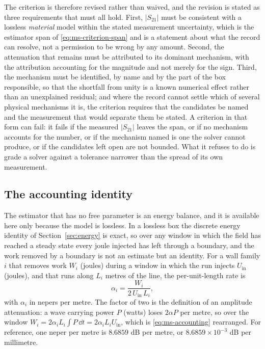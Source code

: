 The criterion is therefore revised rather than waived, and the revision is stated as three requirements that
must all hold. First, $|S_{21}|$ must be consistent with a lossless \emph{material} model within the stated
measurement uncertainty, which is the estimator span of \eqref{eq:ms-criterion-span} and is a statement about
what the record can resolve, not a permission to be wrong by any amount. Second, the attenuation that remains
must be attributed to its dominant mechanism, with the attribution accounting for the magnitude and not merely
for the sign. Third, the mechanism must be identified, by name and by the part of the box responsible, so that
the shortfall from unity is a known numerical effect rather than an unexplained residual; and where the record
cannot settle which of several physical mechanisms it is, the criterion requires that the candidates be named
and the measurement that would separate them be stated. A criterion in that form can fail: it fails if the
measured $|S_{21}|$ leaves the span, or if no mechanism accounts for the number, or if the mechanism named is
one the solver cannot produce, or if the candidates left open are not bounded. What it refuses to do is grade a
solver against a tolerance narrower than the spread of its own measurement.

\subsection{The accounting identity}
\label{sec:ms-accounting}

The estimator that has no free parameter is an energy balance, and it is available here only because the model
is lossless. In a lossless box the discrete energy identity of Section~\ref{sec:energy} is exact, so over any
window in which the field has reached a steady state every joule injected has left through a boundary, and the
work removed by a boundary is not an estimate but an identity. For a wall family $i$ that removes work $W_i$
(joules) during a window in which the run injects $U_{\mathrm{in}}$ (joules), and that runs along $L_i$ metres
of the line, the per-unit-length rate is
\begin{equation}
  \alpha_i = \frac{W_i}{2\,U_{\mathrm{in}}\,L_i},
  \label{eq:ms-accounting}
\end{equation}
with $\alpha_i$ in nepers per metre. The factor of two is the definition of an amplitude attenuation: a wave
carrying power $P$ (watts) loses $2\alpha P$ per metre, so over the window
$W_i = 2\alpha_i L_i \int P\,\dd t = 2\alpha_i L_i U_{\mathrm{in}}$, which is \eqref{eq:ms-accounting}
rearranged. For reference, one neper per metre is $8.6859$ dB per metre, or $8.6859\times10^{-3}$ dB per
millimetre.

